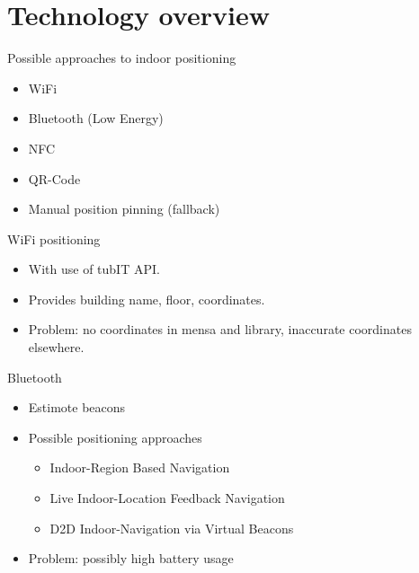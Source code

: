 \documentclass[9pt]{beamer}
\begin{document}
\section{Technology overview}

\begin{frame}{Possible approaches to indoor positioning}

	\begin{itemize}
	
		\item WiFi
		\item Bluetooth (Low Energy)
		\item NFC
		\item QR-Code
		\item Manual position pinning\cite{brimicombe2009location} (fallback)
	
	\end{itemize}

\end{frame}

\begin{frame}{WiFi positioning}

	\begin{itemize}
	
		\item With use of tubIT API.
		\item Provides building name, floor, coordinates.
		\item Problem: no coordinates in mensa and library, inaccurate coordinates elsewhere.

	\end{itemize}
	
\end{frame}

\begin{frame}{Bluetooth \cite{feldmann2003indoor}}

	\begin{itemize}
	
		\item Estimote beacons
		\item Possible positioning approaches
			\begin{itemize}
				\setlength{\itemsep}{1ex}
				\item Indoor-Region Based Navigation
				\item Live Indoor-Location Feedback Navigation
				\item D2D Indoor-Navigation via Virtual Beacons
			\end{itemize}
		\item Problem: possibly high battery usage

	\end{itemize}

\end{frame}
\end{document}
